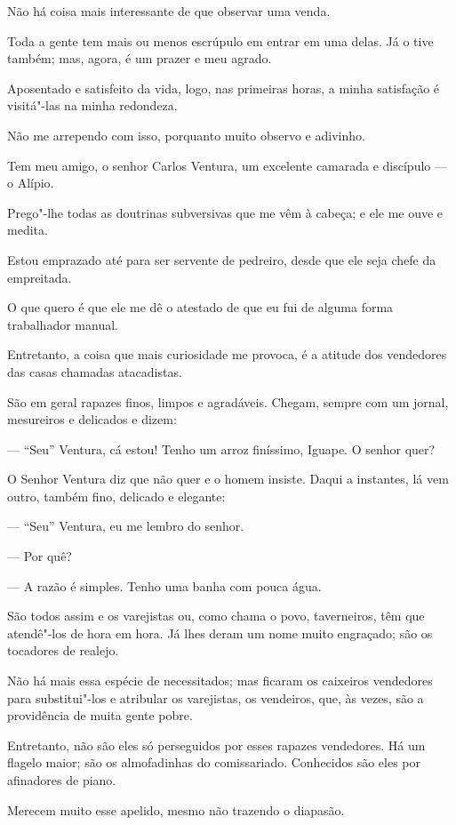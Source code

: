 Não há coisa mais interessante de que observar uma venda.

Toda a gente tem mais ou menos escrúpulo em entrar em uma delas. Já o
tive também; mas, agora, é um prazer e meu agrado.

Aposentado e satisfeito da vida, logo, nas primeiras horas, a minha
satisfação é visitá"-las na minha redondeza.

Não me arrependo com isso, porquanto muito observo e adivinho.

Tem meu amigo, o senhor Carlos Ventura, um excelente camarada e
discípulo --- o Alípio.

Prego"-lhe todas as doutrinas subversivas que me vêm à cabeça; e ele me
ouve e medita.

Estou emprazado até para ser servente de pedreiro, desde que ele seja
chefe da empreitada.

O que quero é que ele me dê o atestado de que eu fui de alguma forma
trabalhador manual.

Entretanto, a coisa que mais curiosidade me provoca, é a atitude dos
vendedores das casas chamadas atacadistas.

São em geral rapazes finos, limpos e agradáveis. Chegam, sempre com um
jornal, mesureiros e delicados e dizem:

--- ``Seu'' Ventura, cá estou! Tenho um arroz finíssimo, Iguape. O senhor
quer?

O Senhor Ventura diz que não quer e o homem insiste. Daqui a instantes,
lá vem outro, também fino, delicado e elegante:

--- ``Seu'' Ventura, eu me lembro do senhor.

--- Por quê?

--- A razão é simples. Tenho uma banha com pouca água.

São todos assim e os varejistas ou, como chama o povo, taverneiros, têm
que atendê"-los de hora em hora. Já lhes deram um nome muito engraçado;
são os tocadores de realejo.

Não há mais essa espécie de necessitados; mas ficaram os caixeiros
vendedores para substitui"-los e atribular os varejistas, os vendeiros,
que, às vezes, são a providência de muita gente pobre.

Entretanto, não são eles só perseguidos por esses rapazes vendedores. Há
um flagelo maior; são os almofadinhas do comissariado. Conhecidos são
eles por afinadores de piano.

Merecem muito esse apelido, mesmo não trazendo o diapasão.

